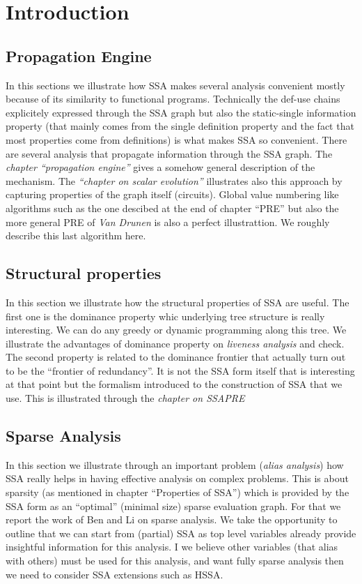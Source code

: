 \chapter{Introduction }

\section{Propagation Engine}
In this sections we illustrate how SSA makes several analysis convenient mostly because of its similarity to functional programs. 
Technically the def-use chains explicitely expressed through the SSA graph but also the static-single information property (that mainly comes from the single definition property and the fact that most properties come from definitions) is what makes SSA so convenient.
There are several analysis that propagate information through the SSA graph.
The \emph{chapter ``propagation engine''} gives a somehow general description of the mechanism.
The \emph{``chapter on scalar evolution''} illustrates also this approach by capturing properties of the graph itself (circuits).
Global value numbering like algorithms such as the one descibed at the end of chapter ``PRE'' but also the more general PRE of \emph{Van Drunen} is also a perfect illustrattion.
We roughly describe this last algorithm here.

\section{Structural properties}
In this section we illustrate how the structural properties of SSA are useful.
The first one is the dominance property whic underlying tree structure is really interesting.
We can do any greedy or dynamic programming along this tree.
We illustrate the advantages of dominance property on \emph{liveness analysis} and check.
The second property is related to the dominance frontier that actually turn out to be the ``frontier of redundancy''.
It is not the SSA form itself that is interesting at that point but the formalism introduced to the construction of SSA that we use.
This is illustrated through the\emph{ chapter on SSAPRE}

\section{Sparse Analysis}
In this section we illustrate through an important problem (\emph{alias analysis}) how SSA really helps in having effective analysis on complex problems.
This is about sparsity (as mentioned in chapter ``Properties of SSA'') which is provided by the SSA form as an ``optimal'' (minimal size) sparse evaluation graph.
For that we report the work of Ben and Li on sparse analysis.
We take the opportunity to outline that we can start from (partial) SSA as top level variables already provide insightful information for this analysis.
I we believe other variables (that alias with others) must be used for this analysis, and want fully sparse analysis then we need to consider SSA extensions such as HSSA.





